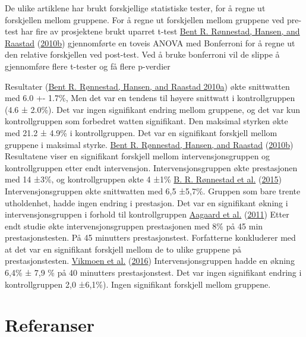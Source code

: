 \documentclass[
]{book}
\begin{document}
De ulike artiklene har brukt forskjellige statistiske tester, for å
regne ut forskjellen mellom gruppene. For å regne ut forskjellen mellom
gruppene ved pre-test har fire av prosjektene brukt uparret t-test
\protect\hyperlink{ref-ruxf8nnestad2010a}{Bent R. Rønnestad, Hansen, and
Raastad} (\protect\hyperlink{ref-ruxf8nnestad2010a}{2010b}) gjennomførte
en toveis ANOVA med Bonferroni for å regne ut den relative forskjellen
ved post-test. Ved å bruke bonferroni vil de slippe å gjennomføre flere
t-tester og få flere p-verdier

Resultater (\protect\hyperlink{ref-ruxf8nnestad2010b}{Bent R. Rønnestad,
Hansen, and Raastad 2010a}) økte snittwatten med 6.0 +- 1.7\%, Men det
var en tendens til høyere snittwatt i kontrollgruppen (4.6 ± 2.0\%). Det
var ingen signifikant endring mellom gruppene, og det var kun
kontrollgruppen som forbedret watten signifikant. Den maksimal styrken
økte med 21.2 ± 4.9\% i kontrollgruppen. Det var en signifikant
forskjell mellom gruppene i maksimal styrke.
\protect\hyperlink{ref-ruxf8nnestad2010a}{Bent R. Rønnestad, Hansen, and
Raastad} (\protect\hyperlink{ref-ruxf8nnestad2010a}{2010b}) Resultatene
viser en signifikant forskjell mellom intervensjonsgruppen og
kontrollgruppen etter endt intervensjon. Intervensjonsgruppen økte
prestasjonen med 14 ±3\%, og kontrollgruppen økte 4 ±1\%
\protect\hyperlink{ref-ruxf8nnestad2015}{B. R. Rønnestad et al.}
(\protect\hyperlink{ref-ruxf8nnestad2015}{2015}) Intervensjonsgruppen
økte snittwatten med 6,5 ±5,7\%. Gruppen som bare trente utholdenhet,
hadde ingen endring i prestasjon. Det var en signifikant økning i
intervensjonsgruppen i forhold til kontrollgruppen
\protect\hyperlink{ref-aagaard2011}{Aagaard et al.}
(\protect\hyperlink{ref-aagaard2011}{2011}) Etter endt studie økte
intervensjonsgruppen prestasjonen med 8\% på 45 min prestasjonstesten.
På 45 minutters prestasjonstest. Forfatterne konkluderer med at det var
en signifikant forskjell mellom de to ulike gruppene på
prestasjonstesten. \protect\hyperlink{ref-vikmoen2016}{Vikmoen et al.}
(\protect\hyperlink{ref-vikmoen2016}{2016}) Intervensjonsgruppen hadde
en økning 6,4\% ± 7,9 \% på 40 minutters prestasjonstest. Det var ingen
signifikant endring i kontrollgruppen 2,0 ±6,1\%). Ingen signifikant
forskjell mellom gruppene.

\hypertarget{referanser-2}{%
\section{Referanser}\label{referanser-2}}
\end{document}

